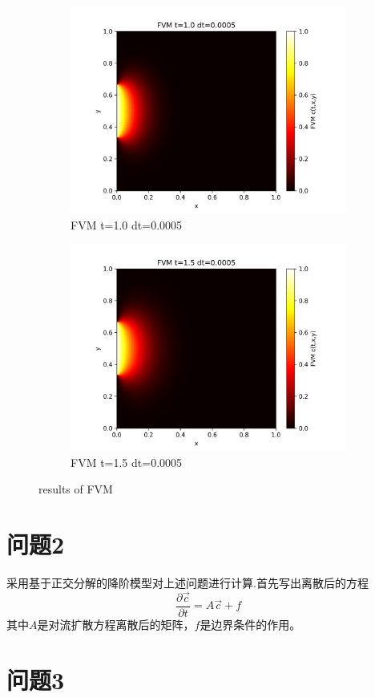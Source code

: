 \documentclass[11pt,a4 paper,one side]{article}
\begin{document}
\begin{figure}[htbp]
    \vspace{0.5cm}  %
    
    \begin{subfigure}{0.45\textwidth}
        \includegraphics[width=\textwidth]{FVM t=1.0 dt=0.0005.png}
        \caption{FVM t=1.0 dt=0.0005}
        \label{FVM t=1.0 dt=0.0005}
    \end{subfigure}
    \hfill
    \begin{subfigure}{0.45\textwidth}
        \includegraphics[width=\textwidth]{FVM t=1.5 dt=0.0005.png}
        \caption{FVM t=1.5 dt=0.0005}
        \label{FVM t=1.5 dt=0.0005}
    \end{subfigure}
    
    \caption{results of FVM}
    \label{results of FVM}
\end{figure}

\section{问题2}
采用基于正交分解的降阶模型对上述问题进行计算.首先写出离散后的方程\begin{equation}
    \frac{\partial \vec{c}}{\partial t} = A\vec{c}+f
\end{equation}
其中$A$是对流扩散方程离散后的矩阵，$f$是边界条件的作用。
\section{问题3}
\end{document}
